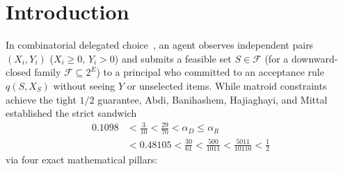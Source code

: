 \documentclass[10pt,twocolumn]{article}
\begin{document}
\section{Introduction}\label{sec:intro}
In combinatorial delegated choice~\cite{kleinberg2018delegated,banihashem2024delegation}, an agent observes independent pairs $(X_i, Y_i)$ ($X_i \ge 0$, $Y_i > 0$) and submits a feasible set $S \in \mathcal{F}$ (for a downward-closed family $\mathcal{F} \subseteq 2^E$) to a principal who committed to an acceptance rule $q(S, X_S)$ without seeing $Y$ or unselected items. While matroid constraints achieve the tight $1/2$ guarantee, Abdi, Banihashem, Hajiaghayi, and Mittal~\cite{abdi2026delegation} established the strict sandwich
\begin{equation}
\begin{aligned}
  0.1098 &< \frac{3}{10} < \frac{29}{70} < \alpha_D \le \alpha_R \\
  &< 0.48105 < \frac{30}{61} < \frac{500}{1011} < \frac{5011}{10110} < \frac{1}{2}
\end{aligned}
  \label{eq:sandwich}
\end{equation}
via four exact mathematical pillars:
\end{document}
